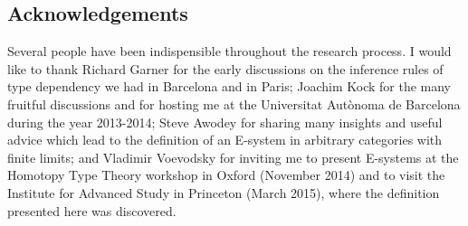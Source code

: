 \documentclass{article}
\begin{document}
\subsection*{Acknowledgements}
Several people have been indispensible throughout the research process.
I would like to thank 
Richard Garner for the early discussions on the inference rules of type 
dependency we had in Barcelona and in Paris; 
Joachim Kock for the many fruitful discussions and for hosting me at the Universitat
Aut\`onoma de Barcelona during the year 2013-2014;
Steve Awodey for sharing many insights and useful advice which lead to the
definition of an E-system in arbitrary categories with finite limits;
and Vladimir Voevodsky for inviting me to present E-systems at the Homotopy Type
Theory workshop in Oxford (November 2014) and to visit the Institute for Advanced 
Study in Princeton (March 2015), where the definition presented here was
discovered.


%

\end{document}

